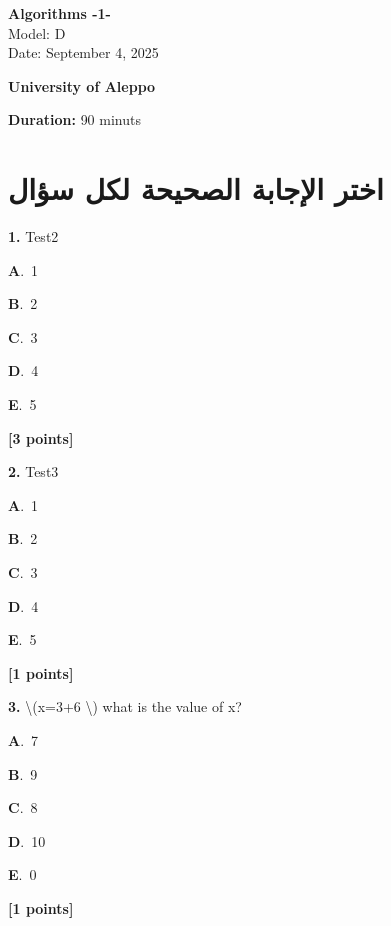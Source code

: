 \documentclass[12pt]{article}
\newcommand{\choice}[3]{%
  \noindent\textbf{#1}.~#2\hfill#3\par\vspace{0.25em}
}
\begin{document}
\begin{flushright}
{\Large \textbf{{\textenglish{Algorithms -1-}}}}\\[0.25em]
{\normalsize \textenglish{Model: }{\textenglish{D}}}\\[0.1em]
{\normalsize \textenglish{Date: }{\textenglish{September 4, 2025}}}
\end{flushright}

\vspace{0.6cm}

\noindent
\begin{minipage}[t]{0.65\textwidth}
  \raggedright
  \textbf{{\textenglish{University of Aleppo}}}\\[0.3em]
\end{minipage}\hfill
\begin{minipage}[t]{0.3\textwidth}
  \raggedleft
  \textenglish{\textbf{Duration: }}{\textenglish{90 minuts}}
\end{minipage}

\vspace{0.9cm}

\section*{اختر الإجابة الصحيحة لكل سؤال}

\noindent \textbf{\textenglish{1.}} {\textenglish{Test2}}

\noindent\choice{A}{{\textenglish{1}}}{}
\noindent\choice{B}{{\textenglish{2}}}{}
\noindent\choice{C}{{\textenglish{3}}}{}
\noindent\choice{D}{{\textenglish{4}}}{}
\noindent\choice{E}{{\textenglish{5}}}{}
\hfill \textbf{[3 points]}\vspace{0.5em}

\noindent \textbf{\textenglish{2.}} {\textenglish{Test3}}

\noindent\choice{A}{{\textenglish{1}}}{}
\noindent\choice{B}{{\textenglish{2}}}{}
\noindent\choice{C}{{\textenglish{3}}}{}
\noindent\choice{D}{{\textenglish{4}}}{}
\noindent\choice{E}{{\textenglish{5}}}{}
\hfill \textbf{[1 points]}\vspace{0.5em}

\noindent \textbf{\textenglish{3.}} {\textenglish{\textbackslash{}(x=3+6 \textbackslash{}) what is the value of x?}}

\noindent\choice{A}{{\textenglish{7}}}{}
\noindent\choice{B}{{\textenglish{9}}}{}
\noindent\choice{C}{{\textenglish{8}}}{}
\noindent\choice{D}{{\textenglish{10}}}{}
\noindent\choice{E}{{\textenglish{0}}}{}
\hfill \textbf{[1 points]}\vspace{0.5em}
\end{document}
